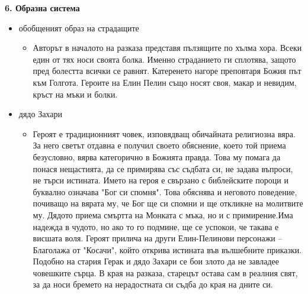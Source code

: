 \documentclass[12pt,a4paper]{article}
\begin{document}
\vspace{0.1cm}
 
\noindent 
\textbf{6. Образна система}
\begin{itemize}[leftmargin=*, noitemsep, topsep=2pt, parsep=0pt]
    \item обобщеният образ на страдащите
    \begin{itemize}[leftmargin=*]
        \item Авторът в началото на разказа представя пълзящите по хълма хора. Всеки един от тях носи своята болка. Именно страданието ги сплотява, защото пред болестта всички се равнят. Катеренето нагоре преповтаря Божия път към Голгота. Героите на Елин Пелин също носят своя, макар и невидим, кръст на мъки и болки.
    \end{itemize}
\end{itemize}

\begin{itemize}[leftmargin=*, noitemsep, topsep=2pt, parsep=0pt]
    \item дядо Захари
    \begin{itemize}[leftmargin=*]
        \item Героят е традиционният човек, изповядващ обичайната религиозна вяра. За него светът отдавна е получил своето обяснение, което той приема безусловно, вярва категорично в Божията правда. Това му помага да понася нещастията, да се примирява със съдбата си, не задава въпроси, не търси истината. Името на героя е свързано с библейските пороци и буквално означава "Бог си спомня". Това обяснява и неговото поведение, почиващо на вярата му, че Бог ще си спомни и ще откликне на молитвите му. Дядото приема смъртта на Монката с мъка, но и с примирение.Има надежда в чудото, но ако то го подмине, ще се успокои, че такава е висшата воля. Героят прилича на други Елин-Пелинови персонажи – Благолажа от "Косачи", който открива истината във вълшебните приказки. Подобно на стария Герак и дядо Захари се бои злото да не завладее човешките сърца. В края на разказа, старецът остава сам в реалния свят, за да носи бремето на нерадостната си съдба до края на дните си.
    \end{itemize}
\end{itemize}
\end{document}
